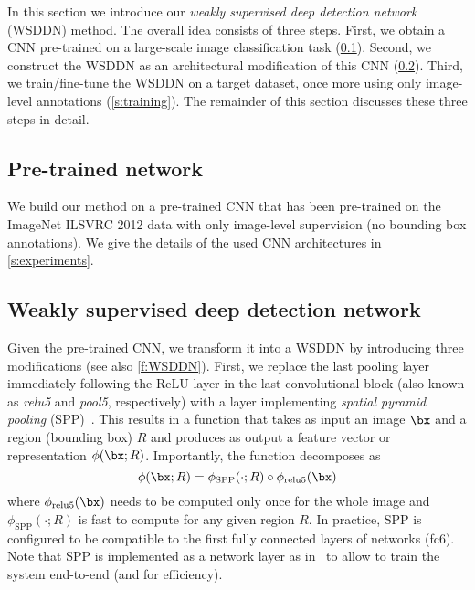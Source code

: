  

In this section we introduce our \emph{weakly supervised deep detection network} (WSDDN) method. The overall idea consists of three steps. First, we obtain a CNN pre-trained on a large-scale image classification task (\cref{s:pretrained}). Second, we construct the WSDDN as an architectural modification of this CNN (\cref{s:WSDDN}). Third, we train/fine-tune the WSDDN on a target dataset, once more using only image-level annotations (\cref{s:training}). The remainder of this section discusses these three steps in detail.
 
\subsection{Pre-trained network}\label{s:pretrained}
We build our method on a pre-trained CNN that has been pre-trained on the ImageNet ILSVRC 2012 data \cite{Russakovsky15} with only image-level supervision (\ie no bounding box annotations). We give the details of the used CNN architectures in \cref{s:experiments}. 
\subsection{Weakly supervised deep detection network}\label{s:WSDDN}

Given the pre-trained CNN, we transform it into a WSDDN by introducing three modifications (see also \cref{f:WSDDN}). First, we replace the last pooling layer immediately following the ReLU layer in the last convolutional block (also known as \textit{relu5} and \textit{pool5}, respectively) with a layer implementing \emph{spatial pyramid pooling} (SPP)~\cite{Lazebnik06,He14}. This results in a function that takes as input an image $\bx$ and a region (bounding box) $R$ and produces as output a feature vector or representation $\phi(\bx;R)$. Importantly, the function decomposes as
\[
\phi(\bx;R) = \phi_{\text{SPP}}(\cdot ; R) \circ \phi_{\text{relu5}}(\bx)
\]
where $\phi_{\text{relu5}}(\bx)$ needs to be computed only once for the whole image and $\phi_{\text{SPP}}(\cdot ; R)$ is fast to compute for any given region $R$. In practice, SPP is configured to be compatible to the first fully connected layers of networks (\ie fc6). Note that SPP is implemented as a network layer as in~\cite{Girshick15} to allow to train the system end-to-end (and for efficiency).

